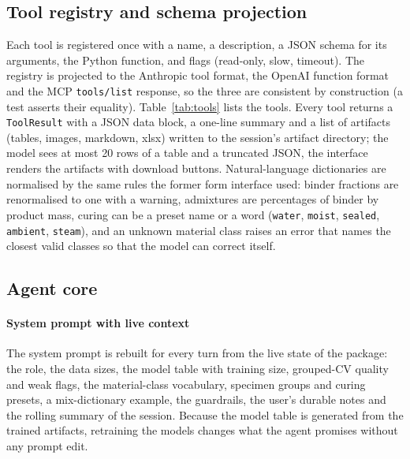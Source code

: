 \documentclass[preprint,12pt]{elsarticle}
\begin{document}
\subsection{Tool registry and schema projection}

Each tool is registered once with a name, a description, a JSON schema for its arguments, the Python function, and flags (read-only, slow, timeout). The registry is projected to the Anthropic tool format, the OpenAI function format and the MCP \texttt{tools/list} response, so the three are consistent by construction (a test asserts their equality). Table~\ref{tab:tools} lists the \nnTools{} tools. Every tool returns a \texttt{ToolResult} with a JSON data block, a one-line summary and a list of artifacts (tables, images, markdown, xlsx) written to the session's artifact directory; the model sees at most 20 rows of a table and a truncated JSON, the interface renders the artifacts with download buttons. Natural-language dictionaries are normalised by the same rules the former form interface used: binder fractions are renormalised to one with a warning, admixtures are percentages of binder by product mass, curing can be a preset name or a word (\texttt{water}, \texttt{moist}, \texttt{sealed}, \texttt{ambient}, \texttt{steam}), and an unknown material class raises an error that names the closest valid classes so that the model can correct itself.

\begin{table}[t]
\centering\scriptsize
\caption{The tool registry. ``slow'' tools take 30--150~s; all tools are read-only with respect to the databases.}
\label{tab:tools}

\end{table}

\subsection{Agent core}

\paragraph{System prompt with live context} The system prompt is rebuilt for every turn from the live state of the package: the role, the data sizes, the model table with training size, grouped-CV quality and weak flags, the material-class vocabulary, specimen groups and curing presets, a mix-dictionary example, the guardrails, the user's durable notes and the rolling summary of the session. Because the model table is generated from the trained artifacts, retraining the models changes what the agent promises without any prompt edit.
\end{document}

